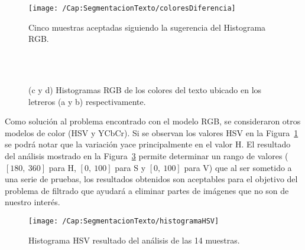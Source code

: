 \begin{figure}[h!]
	\centering
	\texttt{[image: /Cap:SegmentacionTexto/coloresDiferencia]}
	\caption{Cinco muestras aceptadas siguiendo la sugerencia del Histograma RGB.}
	\label{Fig:Cap-segmentaciontexto:coloresDiferencia}
\end{figure}

\begin{figure}[h!]
	\centering
	 { }
   \\
	 { }
   \\
	\caption{(c y d) Histogramas RGB de los colores del texto ubicado en los letreros (a y b) respectivamente.}
	\label{Fig:Cap-segmentaciontexto:errorRGB}
\end{figure}

Como solución al problema encontrado con el modelo RGB, se consideraron otros
modelos de color (HSV y YCbCr). Si se observan los valores HSV en la
Figura~\ref{Fig:Cap-segmentaciontexto:coloresDiferencia} se podrá notar que la
variación yace principalmente en el valor H. El resultado del análisis mostrado
en la Figura~\ref{Fig:Cap-segmentaciontexto:HistogramaHSV} permite determinar un
rango de valores ($[180,~360]$ para H, $[0,~100]$ para S y $[0,~100]$ para V)
que al ser sometido a una serie de pruebas, los resultados obtenidos son
aceptables para el objetivo del problema de filtrado que ayudará a eliminar
partes de imágenes que no son de nuestro interés.

\begin{figure}[h!]
	\texttt{[image: /Cap:SegmentacionTexto/histogramaHSV]}
	\caption{Histograma HSV resultado del análisis de las 14 muestras.}
	\label{Fig:Cap-segmentaciontexto:HistogramaHSV}
\end{figure}

